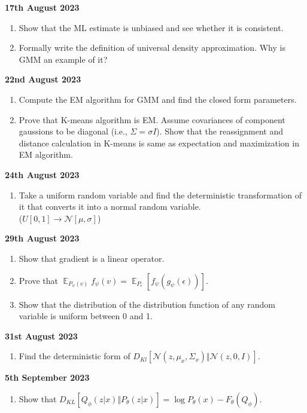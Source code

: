 \documentclass[11pt]{article}
\DeclareMathOperator*{\E}{\mathbb{E}}
\begin{document}
\textbf{17th August 2023}
\begin{enumerate}
\item Show that the ML estimate is unbiased and see whether it is consistent.
\item Formally write the definition of universal density approximation. Why is GMM an example of it?
\end{enumerate}

\textbf{22nd August 2023}
\begin{enumerate}
\item Compute the EM algorithm for GMM and find the closed form parameters.
\item Prove that K-means algorithm is EM. Assume covariances of component gaussions to be diagonal (i.e., $\Sigma = \sigma I$). Show that the reassignment and distance calculation in K-means is same as expectation and maximization in EM algorithm.
\end{enumerate}

\textbf{24th August 2023}
\begin{enumerate}
\item Take a uniform random variable and find the deterministic transformation of it that converts it into a normal random variable. \\($U[0, 1] \rightarrow \mathcal{N}[\mu, \sigma]$)
\end{enumerate}

\textbf{29th August 2023}
\begin{enumerate}
\item Show that gradient is a linear operator.
\item Prove that \( \E_{P_{\psi}(v)} f_{\psi}(v) = \E_{P_{\epsilon}}\left[ f_{\psi}\left( g_{\psi}(\epsilon) \right) \right] \).
\item Show that the distribution of the distribution function of any random variable is uniform between 0 and 1.
\end{enumerate}

\textbf{31st August 2023}
\begin{enumerate}
\item Find the deterministic form of $D_{Kl}\left[ \mathcal{N}(z, \mu_x, \Sigma_x) \Vert \mathcal{N}(z, 0, I) \right]$.
\end{enumerate}

\textbf{5th September 2023}
\begin{enumerate}
\item Show that $D_{KL}\left[ Q_{\phi}(z|x) \Vert P_{\theta}(z|x) \right] = \log P_{\theta}(x) - F_{\theta}(Q_{\phi})$.
\end{enumerate}
\end{document}
